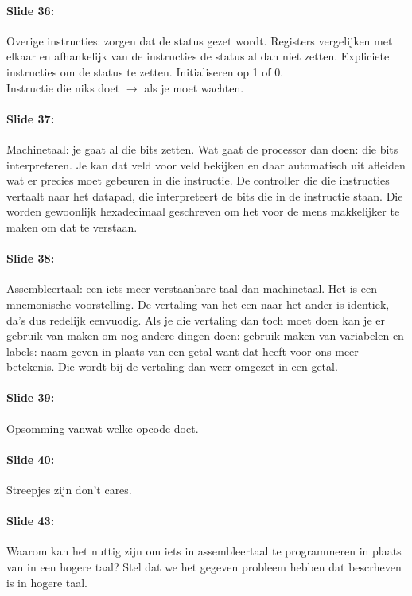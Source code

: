 \documentclass[10pt,a4paper]{book}
\begin{document}
\paragraph{Slide 36:} Overige instructies: zorgen dat de status gezet wordt. Registers vergelijken met elkaar en afhankelijk van de instructies de status al dan niet zetten. Expliciete instructies om de status te zetten. Initialiseren op 1 of 0.\\
Instructie die niks doet $\rightarrow$ als je moet wachten.

\paragraph{Slide 37:} Machinetaal: je gaat al die bits zetten. Wat gaat de processor dan doen: die bits interpreteren. Je kan dat veld voor veld bekijken en daar automatisch uit afleiden wat er precies moet gebeuren in die instructie. De controller die die instructies vertaalt naar het datapad, die interpreteert de bits die in de instructie staan. Die worden gewoonlijk hexadecimaal geschreven om het voor de mens makkelijker te maken om dat te verstaan.

\paragraph{Slide 38:} Assembleertaal: een iets meer verstaanbare taal dan machinetaal. Het is een mnemonische voorstelling. De vertaling van het een naar het ander is identiek, da's dus redelijk eenvuodig. Als je die vertaling dan toch moet doen kan je er gebruik van maken om nog andere dingen doen: gebruik maken van variabelen en labels: naam geven in plaats van een getal want dat heeft voor ons meer betekenis. Die wordt bij de vertaling dan weer omgezet in een getal.

\paragraph{Slide 39:} Opsomming vanwat welke opcode doet. 

\paragraph{Slide 40:} Streepjes zijn don't cares.

\paragraph{Slide 43:} Waarom kan het nuttig zijn om iets in assembleertaal te programmeren in plaats van in een hogere taal? Stel dat we het gegeven probleem hebben dat bescrheven is in hogere taal. 
\end{document}
